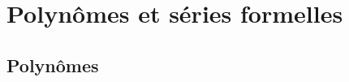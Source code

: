 \documentclass[12pt,a4paper]{book}
\makeatletter
\theoremstyle{definition}
\newcommand\extraspace{
	\vspace{0.25em}
}
\newcommand\whyprefix[2]{%
	\textbf{\prefix{#1}}-#2%
}
\newcommand\mwhyprefix[2]{%
	\texttt{#1 = #1-#2}%
}
\newcommand\prefix[1]{%
	\texttt{#1}%
}
\newcommand\inenglish{\@ifstar{\@inenglish@star}{\@inenglish@no@star}}
\newcommand\@inenglish@star[1]{%
	\emph{\og #1 \fg}%
}
\newcommand\@inenglish@no@star[1]{%
	\@inenglish@star{#1} en anglais%
}
\makeatother
\begin{document}
{{%
%
%
%
%
%
%
%
%
%
%
%
%
%
%
%
%
%
%
%
%
%
%
%
%
%
%
%
%
%
%
%
%





\section{Polynômes et séries formelles}

\subsection{Polynômes}



}}
\end{document}
